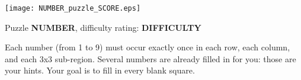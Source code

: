 \documentclass[10pt]{article}
\begin{document}
\thispagestyle{empty}

\noindent \texttt{[image: NUMBER\_puzzle\_SCORE.eps]}

\fontsize{10}{11}
\selectfont

{\centering Puzzle {\bf NUMBER}, difficulty rating:  {\bf DIFFICULTY}

\centering\parbox{0.98\textwidth}{Each number (from 1 to 9) must occur exactly once in each row, each column, and each 3x3 sub-region.  Several numbers are already filled in for you:  those are your hints.  Your goal is to fill in every blank square.}

} 
\end{document}
